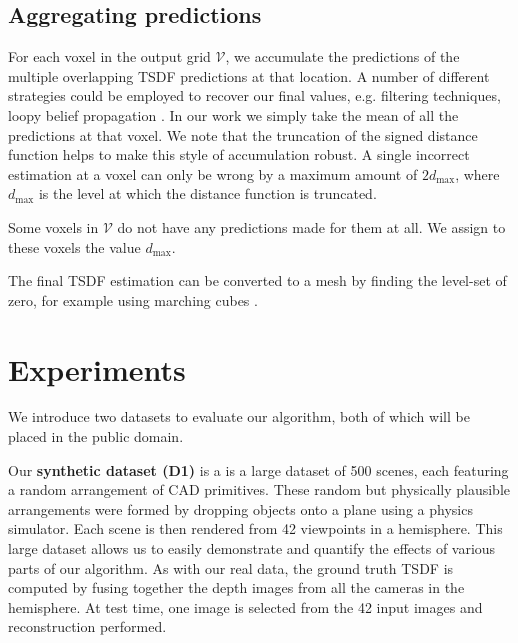\documentclass[10pt,twocolumn,letterpaper]{article}
\makeatletter
\renewcommand*{\eg}{e.g.\@\xspace}
\newcommand{\voxelgrid}{\mathcal{V}}
\renewcommand{\paragraph}{\vspace{2pt}\noindent\textbf}
\makeatother
\begin{document}
\subsection{Aggregating predictions}
\label{sec:combining}

For each voxel in the output grid $\voxelgrid$, we accumulate the predictions of the multiple overlapping TSDF predictions at that location.
A number of different strategies could be employed to recover our final values, \eg filtering techniques, loopy belief propagation \etc.
In our work we simply take the mean of all the predictions at that voxel.
We note that the truncation of the signed distance function helps to make this style of accumulation robust.
A single incorrect estimation at a voxel can only be wrong by a maximum amount of $2d_{\max}$, where $d_{\max}$ is the level at which the distance function is truncated.

Some voxels in $\voxelgrid$ do not have any predictions made for them at all.
We assign to these voxels the value $d_{\max}$.

The final TSDF estimation can be converted to a mesh by finding the level-set of zero, for example using marching cubes \cite{lorensen-siggraph-2013}.


\section{Experiments}
We introduce two datasets to evaluate our algorithm, both of which will be placed in the public domain.

Our \textbf{synthetic dataset (D1)} is a is a large dataset of 500 scenes, each featuring a random arrangement of CAD primitives.
These random but physically plausible arrangements were formed by dropping objects onto a plane using a physics simulator. Each scene is then rendered from 42 viewpoints in a hemisphere.
This large dataset allows us to easily demonstrate and quantify the effects of various parts of our algorithm.
As with our real data, the ground truth TSDF is computed by fusing together the depth images from all the cameras in the hemisphere.
At test time, one image is selected from the 42 input images and reconstruction performed.
\end{document}
